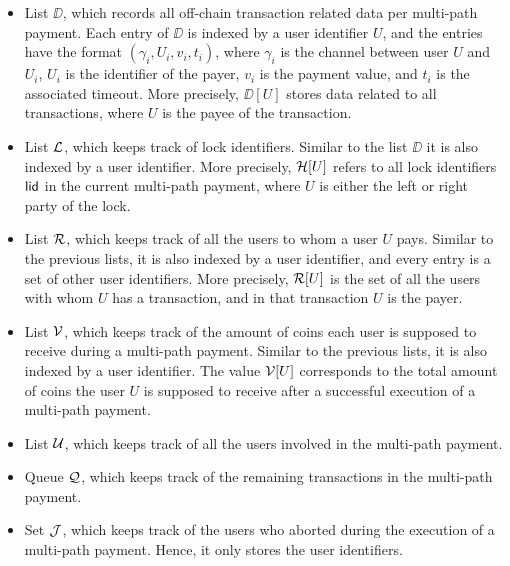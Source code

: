 \begin{itemize}
	\item List $\DD$, which records all off-chain transaction related data per multi-path 
	payment. Each entry of $\DD$ is indexed by a user identifier $U$, and the entries have the 
	format $(\gamma_i,U_i,v_i,t_i)$, where $\gamma_i$ is the channel between user $U$ and $U_i$, 
	$U_i$ is the identifier of the payer, $v_i$ is the payment value, and $t_i$ is the 
	associated timeout. More precisely, $\DD[U]$ stores data related to all transactions, 
	where $U$ is the payee of the transaction. 
	\item List $\mathcal{L}$, which keeps track of lock identifiers. Similar to the list $\DD$ it is 
	also indexed by a user identifier. More precisely, $\mathcal{H}[U]$ refers to all lock identifiers 
	$\mathsf{lid}$ in the current multi-path payment, where $U$ is either the left or right party of 
	the lock.
	\item List $\mathcal{R}$, which keeps track of all the users to whom a user $U$ pays. Similar to 
	the previous lists, it is also indexed by a user identifier, and every entry is a set 
	of other user identifiers. More precisely, $\mathcal{R}[U]$ is the set of all the users with 
	whom $U$ has a transaction, and in that transaction $U$ is the payer.
	\item List $\mathcal{V}$, which keeps track of the amount of coins each user is supposed to 
	receive during a multi-path payment. Similar to the previous lists, it is also indexed 
	by a user identifier. The value $\mathcal{V}[U]$ corresponds to the total amount of coins the 
	user $U$ is supposed to receive after a successful execution of a multi-path payment.
	\item List $\mathcal{U}$, which keeps track of all the users involved in the multi-path payment.
	\item Queue $\mathcal{Q}$, which keeps track of the remaining transactions in the multi-path payment.
	\item Set $\mathcal{J}$, which keeps track of the users who aborted during the execution of 
	a multi-path payment. Hence, it only stores the user identifiers.
\end{itemize}

